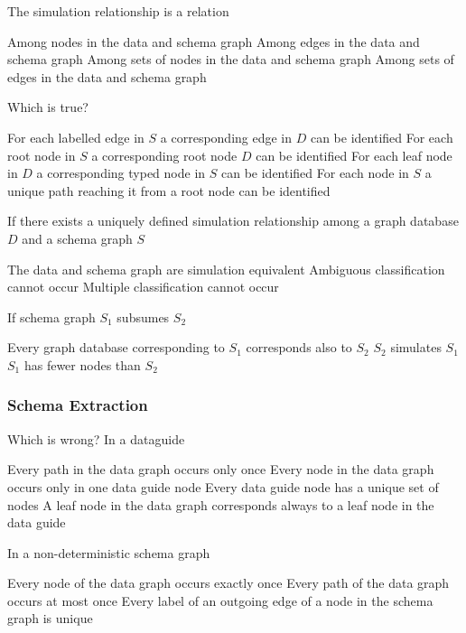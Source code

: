 \documentclass[12pt,a4paper,answers]{exam} %
\begin{document}
\begin{flushleft}
\begin{multicols*}{2}
\begin{questions}
\question The simulation relationship is a relation
\begin{checkboxes}
\CorrectChoice Among nodes in the data and schema graph
\choice Among edges in the data and schema graph
\choice Among sets of nodes in the data and schema graph
\choice Among sets of edges in the data and schema graph
\end{checkboxes}

\question Which is true?
\begin{checkboxes}
\choice For each labelled edge in $S$ a corresponding edge in $D$ can be identified
\choice For each root node in $S$ a corresponding root node $D$ can be identified
\CorrectChoice For each leaf node in $D$ a corresponding typed node in $S$ can be identified
\choice For each node in $S$ a unique path reaching it from a root node can be identified
\end{checkboxes}

\question If there exists a uniquely defined simulation relationship among a graph database $D$ and a schema graph $S$
\begin{checkboxes}
\choice The data and schema graph are simulation equivalent
\CorrectChoice Ambiguous classification cannot occur
\choice Multiple classification cannot occur
\end{checkboxes}

\question If schema graph $S_1$ subsumes $S_2$
\begin{checkboxes}
\choice Every graph database corresponding to $S_1$ corresponds also to $S_2$
\CorrectChoice $S_2$ simulates $S_1$
\choice $S_1$ has fewer nodes than $S_2$
\end{checkboxes}


\subsubsection{Schema Extraction}

\question Which is wrong? In a dataguide
\begin{checkboxes}
\choice Every path in the data graph occurs only once
\CorrectChoice Every node in the data graph occurs only in one data guide node
\choice Every data guide node has a unique set of nodes
\choice A leaf node in the data graph corresponds always to a leaf node in the data guide
\end{checkboxes}

\question In a non-deterministic schema graph
\begin{checkboxes}
\CorrectChoice Every node of the data graph occurs exactly once
\choice Every path of the data graph occurs at most once
\choice Every label of an outgoing edge of a node in the schema graph is unique
\end{checkboxes}




\end{questions}
\end{multicols*}
\end{flushleft}
\end{document}
